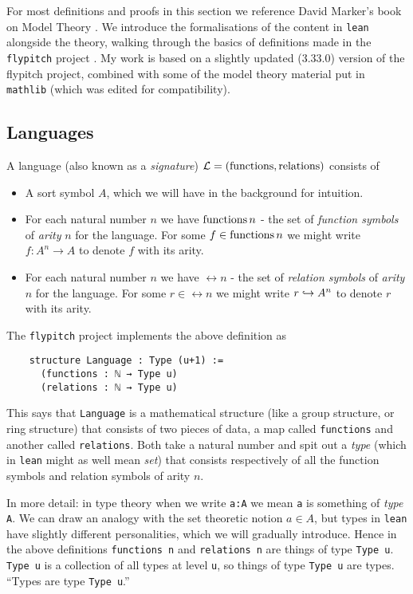 For most definitions and proofs in this section we reference
David Marker's book on Model Theory \cite{marker}.
We introduce the formalisations of the content in \texttt{lean} alongside the theory,
walking through the basics of definitions made in the \texttt{flypitch} project \cite{flypitch}.
My work is based on a slightly updated (3.33.0) version of the flypitch project,
combined with some of the model theory material put in \texttt{mathlib} (which was edited for compatibility).

\subsection{Languages}
\begin{dfn}[Language]
  A language (also known as a \textit{signature}) $\mathcal{L} = ( \operatorname{functions} , \operatorname{relations} )$ consists of

  \begin{itemize}
    \item A sort symbol $A$, which we will have in the background for intuition.
    \item For each natural number $n$ we have $\operatorname{functions} n$ -
          the set of \textit{function symbols} of \textit{arity} $n$ for the language.
          For some $f \in \operatorname{functions} n$ we might write
          $f : A^{n} \to A$ to denote $f$ with its arity.
    \item For each natural number $n$ we have $\rel n$ -
          the set of \textit{relation symbols} of \textit{arity} $n$ for the language.
          For some $r \in \rel n$ we might write
          $r \hookrightarrow A^{n}$ to denote $r$ with its arity.
  \end{itemize}

  The \texttt{flypitch} project implements the above definition as

  \begin{lstlisting}
    structure Language : Type (u+1) :=
      (functions : ℕ → Type u)
      (relations : ℕ → Type u)\end{lstlisting}

  This says that \texttt{Language} is a mathematical structure
  (like a group structure, or ring structure)
  that consists of two pieces of data,
  a map called \texttt{functions} and another called \texttt{relations}.
  Both take a natural number and spit out a \textit{type}
  (which in \texttt{lean} might as well mean \textit{set})
  that consists respectively of all the function symbols and relation symbols of arity $n$.

  In more detail: in type theory when we write \texttt{a:A} we mean \texttt{a} is something
  of \textit{type} \texttt{A}.
  We can draw an analogy with the set theoretic notion $a \in A$,
  but types in \texttt{lean} have slightly different
  personalities, which we will gradually introduce.
  Hence in the above definitions \texttt{functions n} and \texttt{relations n}
  are things of type \texttt{Type u}.
  \texttt{Type u} is a collection of all types at level \texttt{u},
  so things of type \texttt{Type u} are types.
  ``Types are type \texttt{Type u}.''


\end{dfn}
